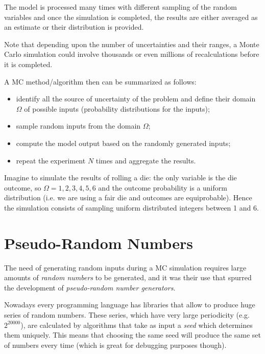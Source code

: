 The model is processed many times with different sampling of the random variables and once the simulation is completed, the results are either averaged as an estimate or their distribution is provided.

Note that depending upon the number of uncertainties and their ranges, a Monte Carlo simulation could involve thousands or even millions of recalculations before it is completed.

A MC method/algorithm then can be summarized as follows:

\begin{itemize}
\item  identify all the source of uncertainty of the problem and define their domain $\Omega$ of possible inputs (probability distributions for the inputs);
\item sample random inputs from the domain $\Omega$;
\item compute the model output based on the randomly generated inputs;
\item repeat the experiment $N$ times and aggregate the results.
\end{itemize}

Imagine to simulate the results of rolling a die: the only variable is the die outcome, so $\Omega =1,2,3,4,5,6$ and the outcome probability is a uniform distribution (i.e. we are using a fair die and outcomes are equiprobable). Hence the simulation consists of sampling uniform distributed integers between 1 and 6.

\section{Pseudo-Random Numbers}
\label{pseudo-random-numbers}

The need of generating random inputs during a MC simulation requires large amounts of \emph{random numbers} to be generated, and it was their use that spurred the development of \emph{pseudo-random number generators}. 

Nowadays every programming language has libraries that allow to produce huge series of random numbers. These series, which have very large periodicity (e.g. \(2^{20000}\)), are calculated by algorithms that take as input a \emph{seed} which determines them uniquely. This means that choosing the same seed will produce the same set of numbers every time (which is great for debugging purposes though).

